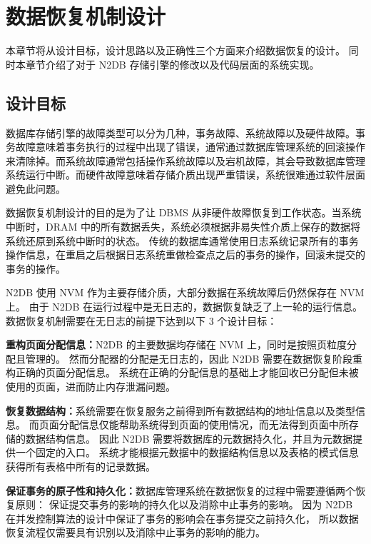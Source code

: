 
\chapter{数据恢复机制设计}
\label{chap:recovery}

本章节将从设计目标，设计思路以及正确性三个方面来介绍数据恢复的设计。
同时本章节介绍了对于 N2DB 存储引擎的修改以及代码层面的系统实现。

\section{设计目标}


数据库存储引擎的故障类型可以分为几种，事务故障、系统故障以及硬件故障。事务故障意味着事务执行的过程中出现了错误，通常通过数据库管理系统的回滚操作来清除掉。而系统故障通常包括操作系统故障以及宕机故障，其会导致数据库管理系统运行中断。而硬件故障意味着存储介质出现严重错误，系统很难通过软件层面避免此问题。

数据恢复机制设计的目的是为了让 DBMS 从非硬件故障恢复到工作状态。当系统中断时，DRAM 中的所有数据丢失，系统必须根据非易失性介质上保存的数据将系统还原到系统中断时的状态。
传统的数据库通常使用日志系统记录所有的事务操作信息，在重启之后根据日志系统重做检查点之后的事务的操作，回滚未提交的事务的操作。

N2DB 使用 NVM 作为主要存储介质，大部分数据在系统故障后仍然保存在 NVM 上。
由于 N2DB 在运行过程中是无日志的，数据恢复缺乏了上一轮的运行信息。
数据恢复机制需要在无日志的前提下达到以下 3 个设计目标：

\textbf{重构页面分配信息：}N2DB 的主要数据均存储在 NVM 上，同时是按照页粒度分配且管理的。
然而分配器的分配是无日志的，因此 N2DB 需要在数据恢复阶段重构正确的页面分配信息。
系统在正确的分配信息的基础上才能回收已分配但未被使用的页面，进而防止内存泄漏问题。

\textbf{恢复数据结构：}系统需要在恢复服务之前得到所有数据结构的地址信息以及类型信息。
而页面分配信息仅能帮助系统得到页面的使用情况，而无法得到页面中所存储的数据结构信息。
因此 N2DB 需要将数据库的元数据持久化，并且为元数据提供一个固定的入口。
系统才能根据元数据中的数据结构信息以及表格的模式信息获得所有表格中所有的记录数据。

\textbf{保证事务的原子性和持久化：}数据库管理系统在数据恢复的过程中需要遵循两个恢复原则：
保证提交事务的影响的持久化以及消除中止事务的影响。
因为 N2DB 在并发控制算法的设计中保证了事务的影响会在事务提交之前持久化，
所以数据恢复流程仅需要具有识别以及消除中止事务的影响的能力。


